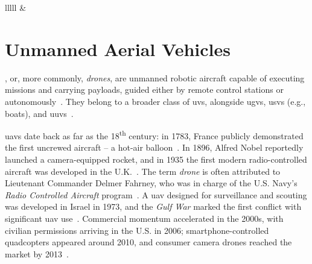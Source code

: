 \begin{table}[!hbtp]
{\begin{tabular}{lllll}
   &
   \\ \hline
\end{tabular}%
}
\end{table}

\section{Unmanned Aerial Vehicles}%
\label{sec:unmann-aeri-vehicl}
,  or, more commonly, \emph{drones}, are unmanned
robotic aircraft capable of executing missions and carrying payloads, guided
either by remote control stations or autonomously~\cite{alladi2022UAVBlockain,glossner2021overview}.
They belong to a broader class of \glspl{uv}, alongside \glspl{ugv}, \glspl{usv}
(e.g., boats), and \glspl{uuv}~\cite{glossner2021overview}.

\glspl{uav} date back as far as the 18\textsuperscript{th} century: in 1783,
France publicly demonstrated the first uncrewed aircraft -- a hot-air
balloon~\cite{uavHistory}. In 1896, Alfred Nobel reportedly launched a
camera-equipped rocket, and in 1935 the first modern radio-controlled aircraft
was developed in the U.K.~\cite{uavHistory}. The term \emph{drone} is often
attributed to Lieutenant Commander Delmer Fahrney, who was in charge of the U.S.
Navy’s \emph{Radio Controlled Aircraft} program~\cite{uavHistory}. A \gls{uav}
designed for surveillance and scouting was developed in Israel in 1973, and the
\emph{Gulf War} marked the first conflict with significant \gls{uav}
use~\cite{uavHistory}. Commercial momentum accelerated in the 2000s, with
civilian permissions arriving in the U.S. in 2006; smartphone-controlled
quadcopters appeared around 2010, and consumer camera drones reached the market
by 2013~\cite{uavHistory}.

